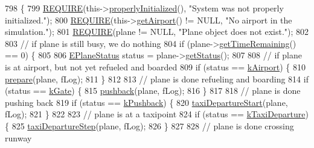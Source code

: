 \begin{DoxyCode}
798                                                    \{
799     \hyperlink{DesignByContract_8h_aeb774672b46dbe80afc14e0d1970f017}{REQUIRE}(this->\hyperlink{classSystem_af3eece83ba2d92a4a6b6c186d427c556}{properlyInitialized}(), \textcolor{stringliteral}{"System was not properly initialized."});
800     \hyperlink{DesignByContract_8h_aeb774672b46dbe80afc14e0d1970f017}{REQUIRE}(this->\hyperlink{classSystem_a8cd2a9b13cdbcf30f801e46cf8284800}{getAirport}() != NULL, \textcolor{stringliteral}{"No airport in the simulation."});
801     \hyperlink{DesignByContract_8h_aeb774672b46dbe80afc14e0d1970f017}{REQUIRE}(plane != NULL, \textcolor{stringliteral}{"Plane object does not exist."});
802 
803     \textcolor{comment}{// if plane is still busy, we do nothing}
804     \textcolor{keywordflow}{if} (plane->\hyperlink{classAirplane_a39233c86a764ac1051ce4b4460a9a684}{getTimeRemaining}() == 0) \{
805 
806         \hyperlink{Airplane_8h_a0e5bbf7c6c727baaba49062300fae19f}{EPlaneStatus} status = plane->\hyperlink{classAirplane_a40bbb3024a476115700977c60bae2705}{getStatus}();
807 
808         \textcolor{comment}{// if plane is at airport, but not yet refueled and boarded}
809         \textcolor{keywordflow}{if} (status == \hyperlink{Airplane_8h_a0e5bbf7c6c727baaba49062300fae19fabfff972a5d3596bc68662c89987639df}{kAirport}) \{
810             \hyperlink{classSystem_a74fc45ac036c70cc5afe021429aa5878}{prepare}(plane, fLog);
811         \}
812 
813         \textcolor{comment}{// plane is done refueling and boarding}
814         \textcolor{keywordflow}{if} (status == \hyperlink{Airplane_8h_a0e5bbf7c6c727baaba49062300fae19fa20dbec285a7773f72e48eccef8ae84da}{kGate}) \{
815             \hyperlink{classSystem_aaf7ec97fc1f23a7aa506fd44581e0f48}{pushback}(plane, fLog);
816         \}
817 
818         \textcolor{comment}{// plane is done pushing back}
819         \textcolor{keywordflow}{if} (status == \hyperlink{Airplane_8h_a0e5bbf7c6c727baaba49062300fae19fa117bb5da4739b13c4915f7d721f3d2a5}{kPushback}) \{
820             \hyperlink{classSystem_ad00d2b047b6b3a93681b37045c4f2142}{taxiDepartureStart}(plane, fLog);
821         \}
822 
823         \textcolor{comment}{// plane is at a taxipoint}
824         \textcolor{keywordflow}{if} (status == \hyperlink{Airplane_8h_a0e5bbf7c6c727baaba49062300fae19fa3a6a40398243a8892b8084a9e0107015}{kTaxiDeparture}) \{
825             \hyperlink{classSystem_a90a664dab1f135035f77bb630e5336d0}{taxiDepartureStep}(plane, fLog);
826         \}
827 
828         \textcolor{comment}{// plane is done crossing runway}

\end{DoxyCode}
